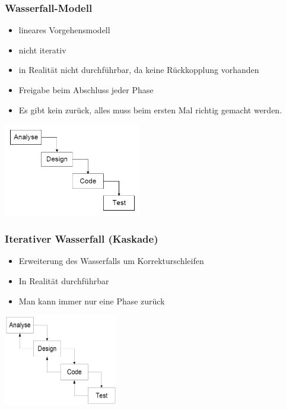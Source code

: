 \subsubsection{Wasserfall-Modell}
\begin{minipage}{10cm}
	\begin{itemize}
		\item lineares Vorgehensmodell
		\item nicht iterativ
		\item in Realität nicht durchführbar, da keine Rückkopplung vorhanden
		\item Freigabe beim Abschluss jeder Phase
		\item Es gibt kein zurück, alles muss beim ersten Mal richtig gemacht werden. 
	\end{itemize}
\end{minipage}
\begin{minipage}{5cm}
	\includegraphics[width=6cm]{images/wasserfallmodell}
\end{minipage}
	
\subsubsection{Iterativer Wasserfall (Kaskade)}
	\begin{minipage}{10cm}
		\begin{itemize}
			\item Erweiterung des Wasserfalls um Korrekturschleifen
			\item In Realität durchführbar
			\item Man kann immer nur eine Phase zurück
		\end{itemize}
	\end{minipage}
	\begin{minipage}{5cm}
	\includegraphics[width=5cm]{images/kaskade.png}	
	\end{minipage}

